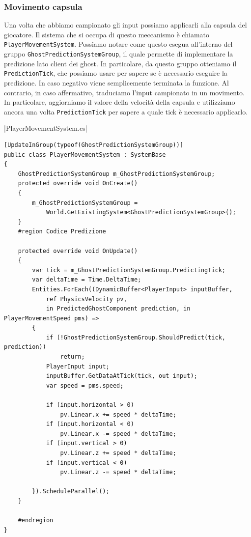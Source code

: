 \subsubsection{Movimento capsula}
Una volta che abbiamo campionato gli input possiamo applicarli alla capsula del giocatore. Il sistema che si occupa di questo meccanismo è chiamato  \verb|PlayerMovementSystem|. Possiamo notare come questo esegua all'interno del gruppo \verb|GhostPredictionSystemGroup|, il quale permette di implementare la predizione lato client dei ghost. In particolare, da questo gruppo otteniamo il \verb|PredictionTick|, che possiamo usare per sapere se è necessario eseguire la predizione. In caso negativo viene semplicemente terminata la funzione. Al contrario, in caso affermativo, traduciamo l'input campionato in un movimento. In particolare, aggiorniamo il valore della velocità della capsula e utilizziamo ancora una volta \verb|PredictionTick| per sapere a quale tick è necessario applicarlo.

|PlayerMovementSystem.cs|

\clearpage
\begin{lstlisting}[caption={File \UseVerb{PlayerMovementSystemTerm}: applicazione del movimento alla capsula, tramite predizione.}, label={lst:prototipo-input-server}, language={[Sharp]C}]
[UpdateInGroup(typeof(GhostPredictionSystemGroup))]
public class PlayerMovementSystem : SystemBase
{
    GhostPredictionSystemGroup m_GhostPredictionSystemGroup;
    protected override void OnCreate()
    {
        m_GhostPredictionSystemGroup =
            World.GetExistingSystem<GhostPredictionSystemGroup>();
    }
    #region Codice Predizione
    
    protected override void OnUpdate() 
    {
        var tick = m_GhostPredictionSystemGroup.PredictingTick;
        var deltaTime = Time.DeltaTime;
        Entities.ForEach((DynamicBuffer<PlayerInput> inputBuffer, 
            ref PhysicsVelocity pv, 
            in PredictedGhostComponent prediction, in PlayerMovementSpeed pms) =>
        {
            if (!GhostPredictionSystemGroup.ShouldPredict(tick, prediction))
                return;
            PlayerInput input;
            inputBuffer.GetDataAtTick(tick, out input);
            var speed = pms.speed;
            
            if (input.horizontal > 0)
                pv.Linear.x += speed * deltaTime;
            if (input.horizontal < 0)
                pv.Linear.x -= speed * deltaTime;
            if (input.vertical > 0)
                pv.Linear.z += speed * deltaTime;
            if (input.vertical < 0)
                pv.Linear.z -= speed * deltaTime;

        }).ScheduleParallel();
    }
    
    #endregion
}
\end{lstlisting}

